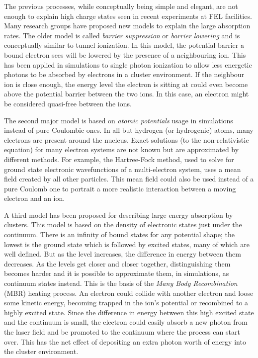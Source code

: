 The previous processes, while conceptually being simple and elegant, are not
enough to explain high charge states seen in recent experiments at FEL
facilities. Many research groups have proposed new models to
explain the large absorption rates. The older model is called \textit{barrier
suppression} or \textit{barrier lowering} and is conceptually similar to tunnel
ionization. In this model, the potential barrier a bound electron sees will be
lowered by the presence of a neighbouring ion. This has been applied in
simulations to single photon ionization to allow less energetic photons to be
absorbed by electrons in a cluster environment. If the neighbour ion is close
enough, the energy level the electron is sitting at could even become above the
potential barrier between the two ions. In this case, an electron might be
considered quasi-free between the ions.

The second major model is based on \textit{atomic potentials} usage in
simulations instead of pure Coulombic ones. In all but hydrogen (or hydrogenic)
atoms, many electrons are present around the nucleus. Exact solutions (to the
non-relativistic \schrodinger equation) for many electron systems are not known
but are approximated by different methods. For example, the Hartree-Fock
method, used to solve for ground state electronic wavefunctions of a
multi-electron system, uses a mean field created by all other particles. This
mean field could also be used instead of a pure Coulomb one to portrait a more
realistic interaction between a moving electron and an ion.

A third model has been proposed for describing large energy absorption by
clusters. This model is based on the density of electronic states just under
the continuum. There is an infinity of bound states for any potential shape;
the lowest is the ground state which is followed by excited states, many of
which are well defined. But as the level increases, the difference in energy
between them decreases. As the levels get closer and closer together,
distinguishing them becomes harder and it is possible to approximate them, in
simulations, as continuum states instead. This is the basis of the \textit{Many
Body Recombination} (MBR) heating process. An electron could collide with
another electron and loose some kinetic energy, becoming trapped in the ion's
potential or recombined to a highly excited state. Since the difference in
energy between this high excited state and the continuum is small, the electron
could easily absorb a new photon from the laser field and be promoted to the
continuum where the process can start over. This has the net effect of
depositing an extra photon worth of energy into the cluster environment.

